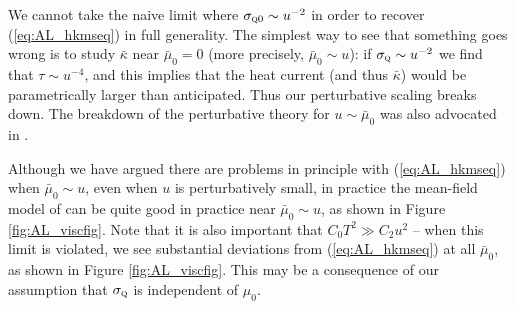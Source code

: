 We cannot take the naive limit where $\sigma_{\textsc{q}0}\sim u^{-2}$ in order to recover (\ref{eq:AL_hkmseq}) in full generality.     The simplest way to see that something goes wrong is to study $\bar\kappa$ near $\bar\mu_0=0$ (more precisely, $\bar\mu_0\sim u$):  if $\sigma_{\textsc{q}} \sim u^{-2}$  we find that $\tau \sim u^{-4}$, and this implies that the heat current (and thus $\bar\kappa$) would be parametrically larger than anticipated.   Thus our perturbative scaling breaks down.   The breakdown of the perturbative theory for $u\sim \bar\mu_0$ was also advocated in \cite{lucas_hydrodynamic_2015}.  
 
 Although we have argued there are problems in principle with (\ref{eq:AL_hkmseq}) when $\bar\mu_0 \sim u$, even when $u$ is perturbatively small, in practice  the mean-field model of \cite{hartnoll_theory_2007} can be quite good in practice near $\bar\mu_0\sim u$, as shown in Figure \ref{fig:AL_viscfig}.   Note that it is also important that $C_0 T^2 \gg C_2 u^2$ -- when this limit is violated, we see substantial deviations from (\ref{eq:AL_hkmseq}) at all $\bar\mu_0$, as shown in Figure \ref{fig:AL_viscfig}.  This may be a consequence of our assumption that $\sigma_{\textsc{q}}$ is independent of $\mu_0$.

 
 

